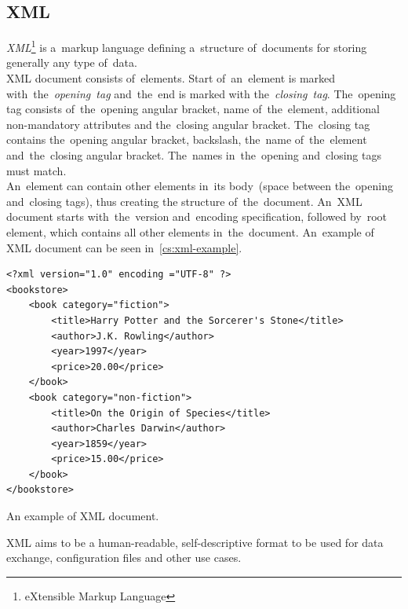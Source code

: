 \subsection{XML}
\label{subsec:XML}
\textit{XML}\footnote{eXtensible Markup Language} is a~markup language defining a~structure of~documents for storing generally any type of~data. \\
XML document consists of~elements. Start of~an~element is marked with~the~\textit{opening~tag} and~the~end is marked with the~\textit{closing~tag}. The~opening tag consists of~the~opening angular bracket, name of~the~element, additional non-mandatory attributes and the~closing angular bracket. The~closing tag contains the~opening angular bracket, backslash, the~name of~the~element and~the~closing angular bracket. The~names in~the~opening and~closing tags must match. \\
An~element can contain other elements in~its body~(space between the~opening and~closing tags), thus creating the structure of~the~document. An~XML document starts with~the~version and~encoding specification, followed by~root element, which contains all other elements in~the~document.
An~example of XML document can be seen in~\autoref{cs:xml-example}.
\begin{listing}[ht!]
\begin{verbatim}
<?xml version="1.0" encoding ="UTF-8" ?>
<bookstore>
    <book category="fiction">
        <title>Harry Potter and the Sorcerer's Stone</title>
        <author>J.K. Rowling</author>
        <year>1997</year>
        <price>20.00</price>
    </book>
    <book category="non-fiction">
        <title>On the Origin of Species</title>
        <author>Charles Darwin</author>
        <year>1859</year>
        <price>15.00</price>
    </book>
</bookstore>
\end{verbatim}
\caption{An example of XML document.}
\label{cs:xml-example}
\end{listing}
XML aims to be a human-readable, self-descriptive format to be used for data exchange, configuration files and other use cases.~\cite{xml:w3c}


